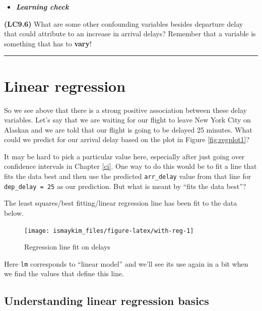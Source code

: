 \documentclass[]{tufte-book}
\let\oldrule=\rule
\renewcommand{\rule}[1]{\oldrule{\linewidth}}
\newenvironment{rmdblock}[1]
  {\begin{shaded*}
  \begin{itemize}
  \renewcommand{\labelitemi}{
    \raisebox{-.7\height}[0pt][0pt]{
    }
  }
  \item
  }
  {
  \end{itemize}
  \end{shaded*}
  }
\newenvironment{learncheck}
  {\begin{rmdblock}{warning}}
  {\end{rmdblock}}
\begin{document}
\begin{learncheck}
\textbf{\emph{Learning check}}
\end{learncheck}

\textbf{(LC9.6)} What are some other confounding variables besides
departure delay that could attribute to an increase in arrival delays?
Remember that a variable is something that has to \textbf{vary}!

\begin{center}\rule{0.5\linewidth}{\linethickness}\end{center}

\section{Linear regression}\label{linear-regression}

So we see above that there is a strong positive association between
these delay variables. Let's say that we are waiting for our flight to
leave New York City on Alaskan and we are told that our flight is going
to be delayed 25 minutes. What could we predict for our arrival delay
based on the plot in Figure \ref{fig:regplot1}?

It may be hard to pick a particular value here, especially after just
going over confidence intervals in Chapter \ref{ci}. One way to do this
would be to fit a line that fits the data best and then use the
predicted \texttt{arr\_delay} value from that line for
\texttt{dep\_delay\ =\ 25} as our prediction. But what is meant by
``fits the data best''?

The least squares/best fitting/linear regression line has been fit to
the data below.

\begin{figure}

{\centering \texttt{[image: ismaykim\_files/figure-latex/with-reg-1]} 

}

\caption[Regression line fit on delays]{Regression line fit on delays}\label{fig:with-reg}
\end{figure}

Here \texttt{lm} corresponds to ``linear model'' and we'll see its use
again in a bit when we find the values that define this line.

\subsection{Understanding linear regression
basics}\label{understanding-linear-regression-basics}
\end{document}
